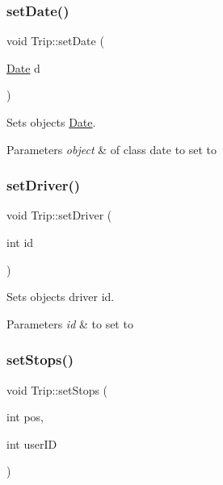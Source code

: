 \subsubsection{\texorpdfstring{set\+Date()}{setDate()}}
{\footnotesize\ttfamily void Trip\+::set\+Date (\begin{DoxyParamCaption}\item[{\hyperlink{class_date}{Date}}]{d }\end{DoxyParamCaption})}



Sets object\textquotesingle{}s \hyperlink{class_date}{Date}. 


\begin{DoxyParams}{Parameters}
{\em object} & of class date to set to \\
\hline
\end{DoxyParams}
\mbox{\label{group___trip_ga2c5c0c0315b210154ba190a5470ec110}} 
\subsubsection{\texorpdfstring{set\+Driver()}{setDriver()}}
{\footnotesize\ttfamily void Trip\+::set\+Driver (\begin{DoxyParamCaption}\item[{int}]{id }\end{DoxyParamCaption})}



Sets object\textquotesingle{}s driver id. 


\begin{DoxyParams}{Parameters}
{\em id} & to set to \\
\hline
\end{DoxyParams}
\mbox{\label{group___trip_gaa294f1f8844c2b47676e0e985d81b2a0}} 
\subsubsection{\texorpdfstring{set\+Stops()}{setStops()}}
{\footnotesize\ttfamily void Trip\+::set\+Stops (\begin{DoxyParamCaption}\item[{int}]{pos,  }\item[{int}]{user\+ID }\end{DoxyParamCaption})}




